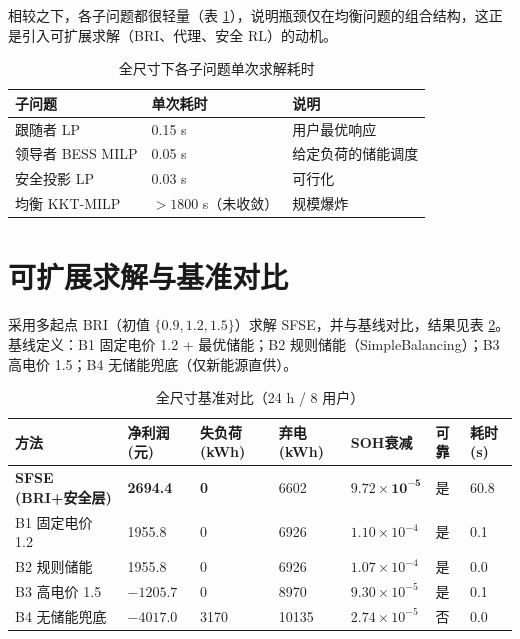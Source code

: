 \documentclass[UTF8,a4paper,11pt]{ctexart}
\begin{document}
相较之下，各子问题都很轻量（表 \ref{tab:sub}），说明瓶颈仅在均衡问题的组合结构，这正是引入可扩展求解（BRI、代理、安全 RL）的动机。

\begin{table}[htbp]
\centering
\small
\caption{全尺寸下各子问题单次求解耗时}
\label{tab:sub}
\begin{tabular}{p{6.0cm} p{4.0cm} p{4.0cm}}
\toprule
\textbf{子问题} & \textbf{单次耗时} & \textbf{说明}\\
\midrule
跟随者 LP & 0.15 s & 用户最优响应\\
领导者 BESS MILP & 0.05 s & 给定负荷的储能调度\\
安全投影 LP & 0.03 s & 可行化\\
\midrule
均衡 KKT-MILP & $>1800$ s（未收敛） & 规模爆炸\\
\bottomrule
\end{tabular}
\end{table}

\section{可扩展求解与基准对比}
采用多起点 BRI（初值 $\{0.9,1.2,1.5\}$）求解 SFSE，并与基线对比，结果见表 \ref{tab:bench}。基线定义：B1 固定电价 1.2 + 最优储能；B2 规则储能（SimpleBalancing）；B3 高电价 1.5；B4 无储能兜底（仅新能源直供）。

\begin{table}[htbp]
\centering
\small
\caption{全尺寸基准对比（24 h / 8 用户）}
\label{tab:bench}
\begin{tabular}{p{3.0cm} p{1.8cm} p{1.6cm} p{1.6cm} p{2.0cm} p{1.2cm} p{1.3cm}}
\toprule
\textbf{方法} & \textbf{净利润(元)} & \textbf{失负荷(kWh)} & \textbf{弃电(kWh)} & \textbf{SOH衰减} & \textbf{可靠} & \textbf{耗时(s)}\\
\midrule
\textbf{SFSE (BRI+安全层)} & \textbf{2694.4} & \textbf{0} & 6602 & $\mathbf{9.72\times10^{-5}}$ & 是 & 60.8\\
B1 固定电价 1.2 & 1955.8 & 0 & 6926 & $1.10\times10^{-4}$ & 是 & 0.1\\
B2 规则储能 & 1955.8 & 0 & 6926 & $1.07\times10^{-4}$ & 是 & 0.0\\
B3 高电价 1.5 & $-1205.7$ & 0 & 8970 & $9.30\times10^{-5}$ & 是 & 0.1\\
B4 无储能兜底 & $-4017.0$ & 3170 & 10135 & $2.74\times10^{-5}$ & 否 & 0.0\\
\bottomrule
\end{tabular}
\end{table}
\end{document}

